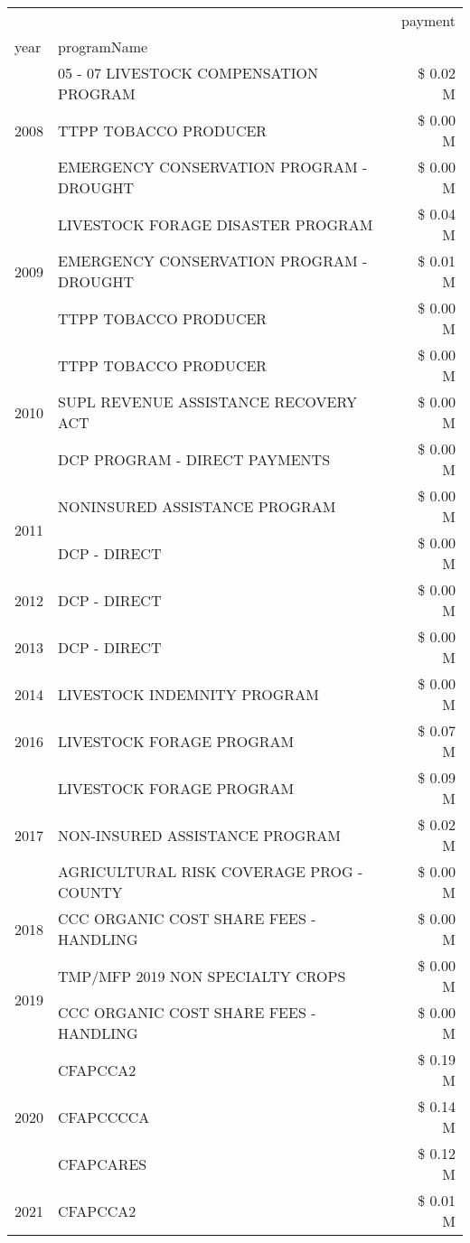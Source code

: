 \begin{tabular}{llr}
\toprule
 &  & payment \\
year & programName &  \\
\midrule
\multirow[t]{3}{*}{2008} & 05 - 07 LIVESTOCK COMPENSATION PROGRAM & \$ 0.02 M \\
 & TTPP TOBACCO PRODUCER & \$ 0.00 M \\
 & EMERGENCY CONSERVATION PROGRAM - DROUGHT & \$ 0.00 M \\
\cline{1-3}
\multirow[t]{3}{*}{2009} & LIVESTOCK FORAGE DISASTER  PROGRAM & \$ 0.04 M \\
 & EMERGENCY CONSERVATION PROGRAM - DROUGHT & \$ 0.01 M \\
 & TTPP TOBACCO PRODUCER & \$ 0.00 M \\
\cline{1-3}
\multirow[t]{3}{*}{2010} & TTPP TOBACCO PRODUCER & \$ 0.00 M \\
 & SUPL REVENUE ASSISTANCE RECOVERY ACT & \$ 0.00 M \\
 & DCP PROGRAM - DIRECT PAYMENTS & \$ 0.00 M \\
\cline{1-3}
\multirow[t]{2}{*}{2011} & NONINSURED ASSISTANCE PROGRAM & \$ 0.00 M \\
 & DCP - DIRECT & \$ 0.00 M \\
\cline{1-3}
2012 & DCP - DIRECT & \$ 0.00 M \\
\cline{1-3}
2013 & DCP - DIRECT & \$ 0.00 M \\
\cline{1-3}
2014 & LIVESTOCK INDEMNITY PROGRAM & \$ 0.00 M \\
\cline{1-3}
2016 & LIVESTOCK FORAGE PROGRAM                      & \$ 0.07 M \\
\cline{1-3}
\multirow[t]{3}{*}{2017} & LIVESTOCK FORAGE PROGRAM & \$ 0.09 M \\
 & NON-INSURED ASSISTANCE PROGRAM & \$ 0.02 M \\
 & AGRICULTURAL RISK COVERAGE PROG - COUNTY & \$ 0.00 M \\
\cline{1-3}
2018 & CCC ORGANIC COST SHARE FEES - HANDLING & \$ 0.00 M \\
\cline{1-3}
\multirow[t]{2}{*}{2019} & TMP/MFP 2019 NON SPECIALTY CROPS & \$ 0.00 M \\
 & CCC ORGANIC COST SHARE FEES - HANDLING & \$ 0.00 M \\
\cline{1-3}
\multirow[t]{3}{*}{2020} & CFAPCCA2 & \$ 0.19 M \\
 & CFAPCCCCA & \$ 0.14 M \\
 & CFAPCARES & \$ 0.12 M \\
\cline{1-3}
2021 & CFAPCCA2 & \$ 0.01 M \\
\cline{1-3}
\bottomrule
\end{tabular}
